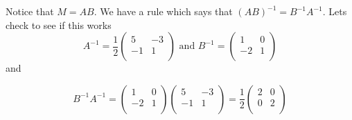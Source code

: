 {Notice that $M = AB$. We have a rule which says that  $(AB)^{-1} = B^{-1}A^{-1}$. Lets check to see if this works
\[
A^{-1} =
\frac{1}{2}
\left( \begin{array}{cc}
5 & -3  \\
-1 & 1\\
\end{array} \right)
\text{ and }
B^{-1}=
\left( \begin{array}{cc}
1 & 0  \\
-2 & 1 \\
\end{array} \right)
\]
and 

\[
B^{-1}A^{-1}=
\left( \begin{array}{cc}
1 & 0  \\
-2 & 1 \\
\end{array} \right)
\left( \begin{array}{cc}
5 & -3  \\
-1 & 1\\
\end{array} \right)
= \frac{1}{2}
\left( \begin{array}{cc}
2 & 0  \\
0 & 2\\
\end{array} \right)
\]



} %

